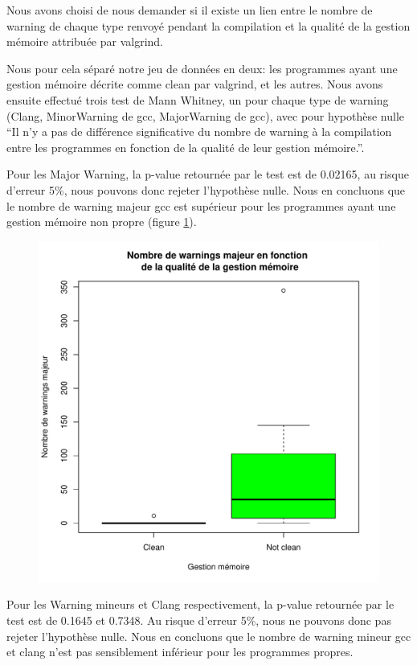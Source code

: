 Nous avons choisi de nous demander si il existe un lien entre le
nombre de warning de chaque type renvoyé pendant la compilation et la
qualité de la gestion mémoire attribuée par valgrind.

Nous pour cela séparé notre jeu de données en deux: les programmes
ayant une gestion mémoire décrite comme clean par valgrind, et les
autres.
Nous avons ensuite effectué trois test de Mann Whitney, un pour chaque
type de warning (Clang, MinorWarning de gcc, MajorWarning de gcc),
avec pour hypothèse nulle ``Il n'y a pas de différence significative
du nombre de warning à la compilation entre les programmes en fonction
de la qualité de leur gestion mémoire.''.

Pour les Major Warning, la p-value retournée par le test est de
0.02165, au risque d'erreur 5\%, nous pouvons donc rejeter
l'hypothèse nulle. Nous en concluons que le nombre de warning majeur gcc
est supérieur pour les programmes ayant une gestion mémoire non propre
(figure \ref{fig:MW_valgr}).

\begin{figure}[h]
  \centering
  \includegraphics[width=.48\textwidth]{figures/MW_valgr.pdf}
  \caption{}\label{fig:MW_valgr}
\end{figure}

Pour les Warning mineurs et Clang respectivement, la p-value retournée
par le test est de 0.1645 et 0.7348. Au risque d'erreur 5\%, nous ne
pouvons donc pas rejeter l'hypothèse nulle. Nous en concluons que le
nombre de warning mineur gcc et clang n'est pas sensiblement inférieur
pour les programmes propres.
